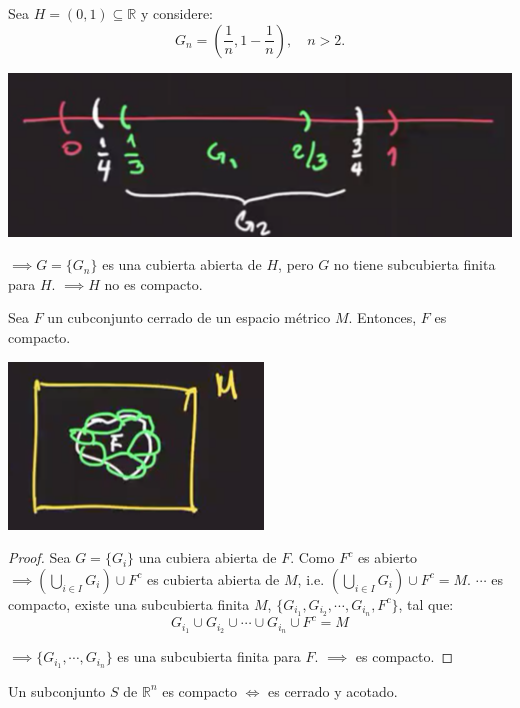 \begin{ejemplo}
	Sea $H=(0,1)\subseteq \mathbb{R}$ y considere: 
	$$G_n=\left(\frac{1}{n}, 1-\frac{1}{n}\right), \quad n>2.$$
	\begin{center}
		\includegraphics[scale=0.4]{images/2/25}
	\end{center}
$\implies G=\{G_n\}$ es una cubierta abierta de $H$, pero $G$ no tiene subcubierta finita para $H$. $\implies H$ no es compacto. 
\end{ejemplo}

\begin{prop}
	Sea $F$ un cubconjunto cerrado de un espacio métrico $M$. Entonces, $F$ es compacto. 
	\begin{center}
		\includegraphics[scale=0.6]{images/2/26}
	\end{center}
\begin{proof}
	Sea $G=\{G_i\}$ una cubiera abierta de $F$. Como $F^c$ es abierto $\implies \left(\bigcup_{i\in I}G_i\right)\cup F^c$ es cubierta abierta de $M$, i.e. $\left(\bigcup_{i\in I}G_i\right)\cup F^c=M$. $\cdots $ es compacto, existe una subcubierta finita $M$, $\{G_{i_1}, G_{i_2},\cdots, G_{i_n},F^c\}$, tal que: $$G_{i_1}\cup G_{i_2}\cup \cdots\cup G_{i_n}\cup F^c=M$$

$\implies \{G_{i_1}, \cdots, G_{i_n}\}$ es una subcubierta finita para $F$. $\implies$ es compacto. \end{proof}
\end{prop}

\begin{teorema}
	Un subconjunto $S$ de $\mathbb{R}^n$ es compacto $\iff$ es cerrado y acotado. 
\end{teorema}


